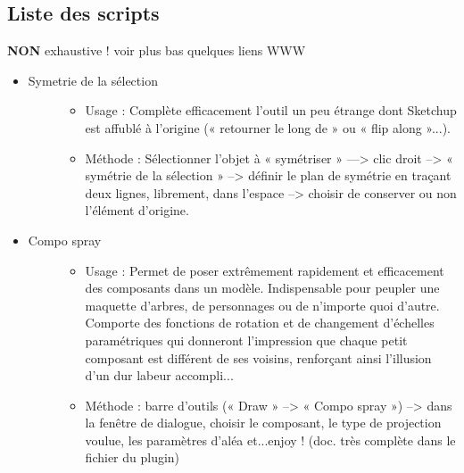 \documentclass[a4paper,12pt,french]{sphinxmanual}
\begin{document}
\subsection{Liste des scripts}
\label{su/install-plugin-su:liste-des-scripts}
\textbf{NON} exhaustive ! voir plus bas quelques liens WWW
\begin{itemize}
\item {} \begin{description}
\item[{Symetrie de la sélection}] \leavevmode\begin{itemize}
\item {} 
Usage : Complète efficacement l'outil un peu étrange dont Sketchup est affublé à l'origine (« retourner le long de » ou « flip along »...).

\item {} 
Méthode : Sélectionner l'objet à « symétriser » ---\textgreater{} clic droit --\textgreater{} « symétrie de la sélection » --\textgreater{} définir le plan de symétrie en traçant deux lignes, librement, dans l'espace --\textgreater{} choisir de conserver ou non l'élément d'origine.

\end{itemize}

\end{description}

\item {} \begin{description}
\item[{Compo spray}] \leavevmode\begin{itemize}
\item {} 
Usage : Permet de poser extrêmement rapidement et efficacement des composants dans un modèle. Indispensable pour peupler une maquette d'arbres, de personnages ou de n'importe quoi d'autre. Comporte des fonctions de rotation et de changement d'échelles paramétriques qui donneront l'impression que chaque petit composant est différent de ses voisins, renforçant ainsi l'illusion d'un dur labeur accompli...

\item {} 
Méthode : barre d'outils (« Draw » --\textgreater{} « Compo spray ») --\textgreater{} dans la fenêtre de dialogue, choisir le composant, le type de projection voulue, les paramètres d'aléa et...enjoy ! (doc. très complète dans le fichier du plugin)

\end{itemize}

\end{description}


\end{itemize}
\end{document}
